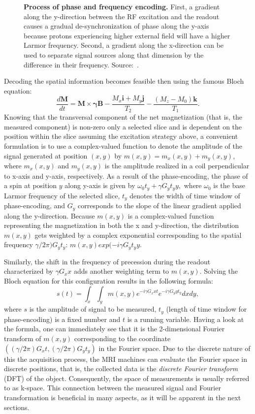 \begin{figure}[thb]
\begin{minipage}{0.53\textwidth}
        \caption{\textbf{Process of phase and frequency encoding.} First, a gradient along the y-direction between the RF excitation and the readout causes a gradual de-synchronization of phase along the y-axis because protons experiencing higher external field will have a higher Larmor frequency. Second, a gradient along the x-direction can be used to separate signal sources along that dimension by the difference in their frequency. Source:~\cite{ridgway_cardiovascular_2010}.}
        \label{fig:phase_and_freq_encoding}
    \end{minipage}
\end{figure}

Decoding the spatial information becomes feasible then using the famous Bloch equation:
\[\frac{d\mathbf{M}}{dt} = \mathbf{M} \times \boldsymbol{\gamma} \mathbf{B} - \frac{M_x\mathbf{i} + M_y\mathbf{j}}{T_2} - \frac{(M_z - M_0)\mathbf{k}}{T_1}.\]
Knowing that the transversal component of the net magnetization (that is, the measured component) is non-zero only a selected slice and is dependent on the position within the slice assuming the excitation strategy above, a convenient formulation is to use a complex-valued function to denote the amplitude of the signal generated at position $(x,y)$ by $m(x,y) = m_x(x,y) + m_y(x,y)$, where $m_x(x,y)$ and $m_y(x,y)$ is the amplitude realized in a coil perpendicular to x-axis and y-axis, respectively. As a result of the phase-encoding, the phase of a spin at position $y$ along y-axis is given by $\omega_0 t_y + \gamma G_y t_y y,$ where $\omega_0$ is the base Larmor frequency of the selected slice, $t_y$ denotes the width of time window of phase-encoding, and $G_y$ corresponds to the slope of the linear gradient applied along the y-direction. Because $m(x,y)$ is a complex-valued function representing the magnetization in both the x and y-direction, the distribution $m(x,y)$ gets weighted by a complex exponential corresponding to the spatial frequency $\gamma/2\pi)G_y t_y$: $m(x,y)exp(-i\gamma G_y t_y y$. 

Similarly, the shift in the frequency of precession during the readout characterized by $\gamma G_x x$ adds another weighting term to $m(x,y)$. Solving the Bloch equation for this configuration results in the following formula:
\[s(t) = \int_x \int_y m(x,y) e^{-i\gamma G_x x t} e^{-i\gamma G_y y t_y} dx dy,\]
where $s$ is the amplitude of signal to be measured, $t_y$ (length of time window for phase-encoding) is a fixed number and $t$ is a running variable. Having a look at the formula, one can immediately see that it is the 2-dimensional Fourier transform of $m(x,y)$ corresponding to the coordinate $((\gamma/2\pi)G_x t, (\gamma/2\pi)G_y t_y)$ in the Fourier space. Due to the discrete nature of this the acquisition process, the MRI machines can evaluate the Fourier space in discrete positions, that is, the collected data is the \textit{discrete Fourier transform} (DFT) of the object. Consequently, the space of measurements is usually referred to as k-space. This connection between the measured signal and Fourier transformation is beneficial in many aspects, as it will be apparent in the next sections.

